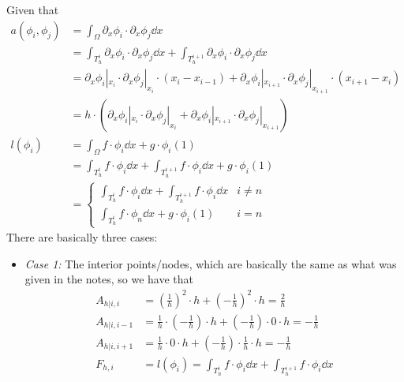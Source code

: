 \begin{enumerate}[label=(\alph*),leftmargin=*,itemsep=0mm]
    Given that
    \begin{align}
        a(\phi_i,\phi_j) &= \int_\Omega \partial_x\phi_i \cdot \partial_x\phi_j \dd{x} \nonumber \\
        &= \int_{T_h^i} \partial_x\phi_i \cdot \partial_x\phi_j \dd{x}
        + \int_{T_h^{i+1}} \partial_x\phi_i \cdot \partial_x\phi_j \dd{x} \nonumber \\
        &= \partial_x\phi_i|_{x_i} \cdot \partial_x\phi_j|_{x_i} \cdot (x_i-x_{i-1})
        + \partial_x\phi_i|_{x_{i+1}} \cdot \partial_x\phi_j|_{x_{i+1}} \cdot (x_{i+1}-x_i) \nonumber \\\
        &= h \cdot ( \partial_x\phi_i|_{x_i} \cdot \partial_x\phi_j|_{x_i}
        + \partial_x\phi_i|_{x_{i+1}} \cdot \partial_x\phi_j|_{x_{i+1}} ) \\
        l(\phi_i) &= \int_\Omega f\cdot\phi_i \dd{x} + g\cdot \phi_i(1) \nonumber \\
        &= \int_{T_h^i} f\cdot\phi_i \dd{x} + \int_{T_h^{i+1}} f\cdot\phi_i \dd{x} + g\cdot \phi_i(1) \nonumber \\
        &= \begin{cases}
        \int_{T_h^i} f\cdot\phi_i \dd{x} + \int_{T_h^{i+1}} f\cdot\phi_i \dd{x} & i \neq n\\
        \int_{T_h^i} f\cdot\phi_n \dd{x} + g\cdot \phi_i(1) & i = n
        \end{cases}
    \end{align}
    \newpage
    There are basically three cases:
    \begin{itemize}
        \item \textit{Case 1:} The interior points/nodes, which are basically the same as what was given in the notes, so we have that
        \begin{align*}
            A_{h|i,i} &= \left(\frac{1}{h}\right)^2 \cdot h
            + \left(-\frac{1}{h}\right)^2 \cdot h
            = \frac{2}{h}\\
            A_{h|i,i-1} &= \frac{1}{h} \cdot \left(-\frac{1}{h}\right) \cdot h
            + \left(-\frac{1}{h}\right) \cdot 0 \cdot h
            = -\frac{1}{h} \\
            A_{h|i,i+1} &= \frac{1}{h} \cdot 0 \cdot h
            + \left(-\frac{1}{h}\right) \cdot \frac{1}{h} \cdot h
            = -\frac{1}{h} \\
            F_{h,i} &= l(\phi_i) = \int_{T_h^i} f\cdot\phi_i \dd{x} + \int_{T_h^{i+1}} f\cdot\phi_i \dd{x}
        \end{align*}
        

\end{itemize}
\end{enumerate}
